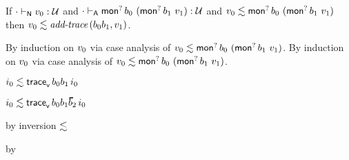 \begin{lemma}\label{HA-mon-trace}
  If\/ $\snil \sWTN \svalue_0 : \tdyn$
  and\/ $\snil \sWTA \emopt{\sbnd_0}{(\emopt{\sbnd_1}{\svalue_1})} : \tdyn$
  and\/ $\rexpr{\svalue_0}{\emopt{\sbnd_0}{(\emopt{\sbnd_1}{\svalue_1})}}$
  then\/ $\rexpr{\svalue_0}{\faddtrace{\fconcat{\sbnd_0}{\sbnd_1}}{\svalue_1}}$.
\end{lemma}{
  \newcommand{\shortpf}{By induction on $\svalue_0$ via case analysis of $\rexpr{\svalue_0}{\emopt{\sbnd_0}{(\emopt{\sbnd_1}{\svalue_1})}}$.}
\begin{lamportproof*}
  \shortpf
\mainproof
  \shortpf

    \begin{pfproof}
      \qedstep
        \begin{pfproof}
          $\rexpr{\sint_0}{\ehist{\fconcat{\sbnd_0}{\sbnd_1}}{\sint_0}}$
        \end{pfproof}
    \end{pfproof}

    \begin{pfproof}
      \qedstep
        \begin{pfproof}
          $\rexpr{\sint_0}{\ehist{\fconcat{\sbnd_0}{\fconcat{\sbnd_1}{\sblist_2}}}{\sint_0}}$
        \end{pfproof}
    \end{pfproof}

    \begin{pfproof}
        \begin{pfproof}
          by inversion $\srexpr$
        \end{pfproof}
        \begin{pfproof}
          by \pfih
        \end{pfproof}
      \qedstep
        \begin{pfproof}
          \begin{mathpar}
          \end{mathpar}
        \end{pfproof}
    \end{pfproof}


\end{lamportproof*}}
